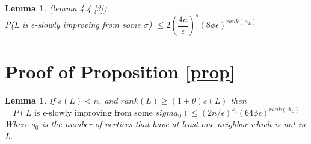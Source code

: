 \documentclass[12pt]{article}
\newtheorem{lemma}[theorem]{Lemma}
\begin{document}
\begin{lemma}(lemma 4.4 [3])\\
\label{bound}
P(L is $\epsilon$-slowly improving from some $\sigma$) $\leq 2 (\dfrac{4n}{\epsilon})^s (8\phi \epsilon)^{rank(A_L)}$

\end{lemma}


\section{Proof of Proposition \ref{prop}}
\label{coreProof}

\begin{lemma}
\label{boundN}
If $s(L) < n$, and $rank(L) \geq (1+\theta)s(L)$ then \\
\begin{equation*}
P(L \text{ is }\epsilon\text{-slowly improving from some }sigma_0)  \leq (2n/\epsilon)^{s_0}(64\phi\epsilon)^{rank(A_L)}
\end{equation*}
Where $s_0$ is the number of vertices that have at least one neighbor which is not in L. 
\end{lemma}
\end{document}
